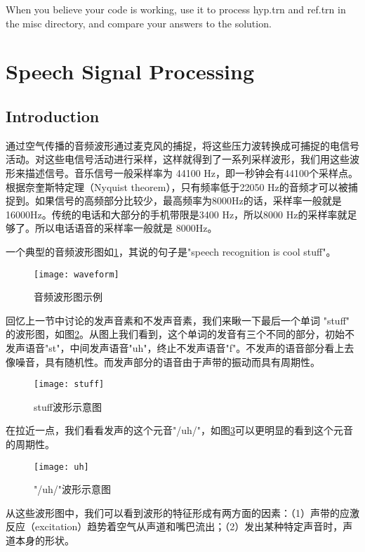 When you believe your code is working, use it to process hyp.trn and ref.trn in the misc directory, and compare your answers to the solution.


\section{Speech Signal Processing}
\subsection{Introduction} %
\label{sub:introduction}
通过空气传播的音频波形通过麦克风的捕捉，将这些压力波转换成可捕捉的电信号活动。对这些电信号活动进行采样，这样就得到了一系列采样波形，我们用这些波形来描述信号。音乐信号一般采样率为 44100 Hz，即一秒钟会有44100个采样点。根据奈奎斯特定理（Nyquist theorem），只有频率低于22050 Hz的音频才可以被捕捉到。如果信号的高频部分比较少，最高频率为8000Hz的话，采样率一般就是16000Hz。传统的电话和大部分的手机带限是3400 Hz，所以8000 Hz的采样率就足够了。所以电话语音的采样率一般就是 8000Hz。

一个典型的音频波形图如\ref{fig:waveform}，其说的句子是"speech recognition is cool stuff"。
\begin{figure}[htbp]
  \centering
  \texttt{[image: waveform]}
  \caption{音频波形图示例 \label{fig:waveform}}
\end{figure}

回忆上一节中讨论的发声音素和不发声音素，我们来瞅一下最后一个单词 "stuff" 的波形图，如图\ref{fig:stuff}。从图上我们看到，这个单词的发音有三个不同的部分，初始不发声语音"st"，中间发声语音"uh"，终止不发声语音"f"。不发声的语音部分看上去像噪音，具有随机性。而发声部分的语音由于声带的振动而具有周期性。
\begin{figure}[htbp]
  \centering
  \texttt{[image: stuff]}
  \caption{stuff波形示意图 \label{fig:stuff}}
\end{figure}

在拉近一点，我们看看发声的这个元音"/uh/"，如图\ref{fig:uh}可以更明显的看到这个元音的周期性。
\begin{figure}[htbp]
  \centering
  \texttt{[image: uh]}
  \caption{"/uh/"波形示意图 \label{fig:uh}}
\end{figure}

从这些波形图中，我们可以看到波形的特征形成有两方面的因素：（1）声带的应激反应（excitation）趋势着空气从声道和嘴巴流出；（2）发出某种特定声音时，声道本身的形状。

